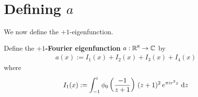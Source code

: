 \section{Defining $a$}


We now define the $+1$-eigenfunction.

\begin{boxdefinition}
    Define the \textbf{$+1$-Fourier eigenfunction} $a : \mathbb{R}^8 \to \mathbb{C}$ by
    \begin{align*}
        a(x) := I_1(x) + I_2(x) + I_3(x) + I_4(x)
    \end{align*}
    where
    \begin{align*}
        I_1(x) := \int_{-1}^{i} \phi_0 \left( \frac{-1}{z+1} \right) \, (z+1)^2 \, e^{\pi i r^2 z} \, \operatorname{d}\!{z}
    \end{align*}
\end{boxdefinition}